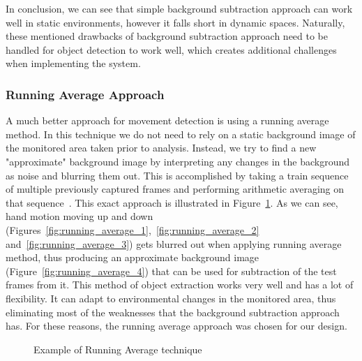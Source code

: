 	In conclusion, we can see that simple background subtraction approach can work well in static environments, however it falls short in dynamic spaces. Naturally, these mentioned drawbacks of background subtraction approach need to be handled for object detection to work well, which creates additional challenges when implementing the system.

	\subsubsection{Running Average Approach}
	\label{sec:running_average_approach}
	A much better approach for movement detection is using a running average method. In this technique we do not need to rely on a static background image of the monitored area taken prior to analysis. Instead, we try to find a new "approximate" background image by interpreting any changes in the background as noise and blurring them out. This is accomplished by taking a train sequence of multiple previously captured frames and performing arithmetic averaging on that sequence~\cite{running_average_approach_1}. This exact approach is illustrated in Figure~\ref{fig:running_average_example}. As we can see, hand motion moving up and down (Figures~\ref{fig:running_average_1},~\ref{fig:running_average_2} and~\ref{fig:running_average_3}) gets blurred out when applying running average method, thus producing an approximate background image (Figure~\ref{fig:running_average_4}) that can be used for subtraction of the test frames from it. This method of object extraction works very well and has a lot of flexibility. It can adapt to environmental changes in the monitored area, thus eliminating most of the weaknesses that the background subtraction approach has. For these reasons, the running average approach was chosen for our design.
	\begin{figure}[ht]
		\centering
		\quad
		\quad
		\caption{Example of Running Average technique}
		\label{fig:running_average_example}
	\end{figure}
